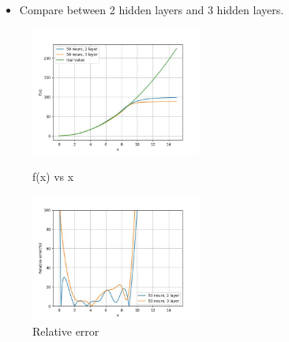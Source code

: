 \documentclass{beamer}
\begin{document}
\begin{frame}
    \frametitle{\secname}
    \begin{itemize}
        \item Compare between 2 hidden layers and 3 hidden layers.
    \end{itemize}

    \begin{figure}
        \begin{multicols}{2}
            \includegraphics[width=2.2in]{Figs/Value_layer_compare.jpg}
            \caption{f(x) vs x}
            \columnbreak

            \includegraphics[width=2.2in]{Figs/Error_layer_compare.jpg}
            \caption{Relative error}
        \end{multicols}
    \end{figure}
\end{frame}
\end{document}
